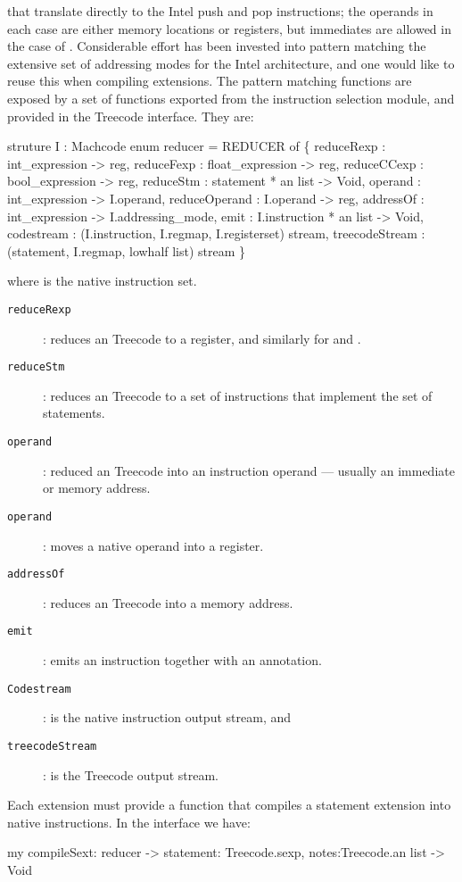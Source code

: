that translate directly to the Intel push and pop instructions; the
operands in each case are either memory locations or registers, but
immediates are allowed in the case of . Considerable effort 
has been invested into pattern matching the extensive set of
addressing modes for the Intel architecture, and
one would like to reuse this when compiling extensions. The pattern
matching functions are exposed by a set of functions exported from the 
instruction selection module, and provided in the Treecode
interface. They are: 

\begin{SML}
  struture I : Machcode
  enum reducer = 
    REDUCER of \{
      reduceRexp    : int_expression -> reg,
      reduceFexp    : float_expression -> reg,
      reduceCCexp   : bool_expression -> reg,
      reduceStm     : statement * an list -> Void,
      operand       : int_expression -> I.operand,
      reduceOperand : I.operand -> reg,
      addressOf     : int_expression -> I.addressing_mode,
      emit          : I.instruction * an list -> Void,
      codestream   : (I.instruction, I.regmap, I.registerset) stream,
      treecodeStream  : (statement, I.regmap, lowhalf list) stream
    \}
\end{SML}

where  is the native instruction set. 
\begin{description}
\item[\tt reduceRexp]: reduces an Treecode  to a register, and
	similarly for  and .
\item[\tt reduceStm]: reduces an Treecode  to a set of instructions
	that implement the set of statements.
\item[\tt operand]: reduced an Treecode  into an instruction
operand --- usually an immediate or memory address.
\item[\tt operand]: moves a native operand into a register.
\item[\tt addressOf]: reduces an Treecode  into a memory address.
\item[\tt emit]: emits an instruction together with an annotation.
\item[\tt Codestream]: is the native instruction output stream, and
\item[\tt treecodeStream]: is the Treecode output stream.
\end{description}

Each extension must provide a function  that compiles
a statement extension into native instructions. In the
 interface we have:
\begin{SML}
  my compileSext: reducer -> {statement: Treecode.sexp, notes:Treecode.an list} -> Void
\end{SML}

